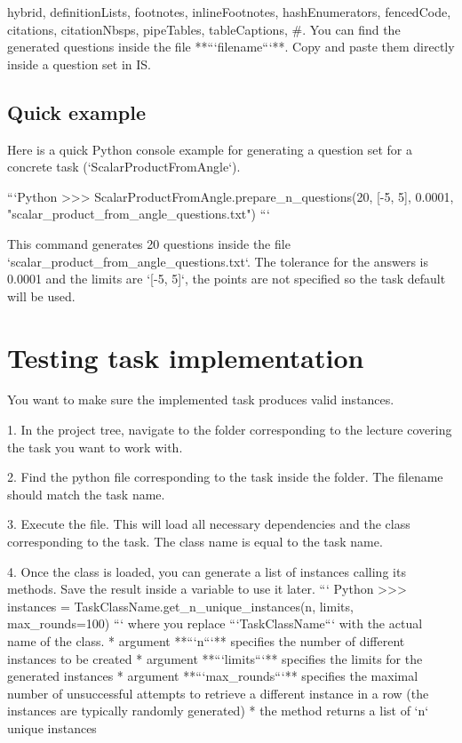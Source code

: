 \documentclass[
  digital, %
  table,   %
  twoside, %
  nolof,     %
  nolot,     %
  draft=false,
  final,
]{fithesis3}
\begin{document}
\begin{markdown*}{%
  hybrid,
  definitionLists,
  footnotes,
  inlineFootnotes,
  hashEnumerators,
  fencedCode,
  citations,
  citationNbsps,
  pipeTables,
  tableCaptions,
}
#. You can find the generated questions inside the file **```filename```**. Copy and paste them directly inside a question set in IS.

\subsection{Quick example}

Here is a quick Python console example for generating a question set for a concrete task (`ScalarProductFromAngle`).  

```Python
>>> ScalarProductFromAngle.prepare_n_questions(20, [-5, 5], 0.0001,                         "scalar_product_from_angle_questions.txt")
```

This command generates 20 questions inside the file \newline `scalar_product_from_angle_questions.txt`. The tolerance for the answers is 0.0001 and the limits are `[-5, 5]`, the points are not specified so the task default will be used. 

\section{Testing task implementation}

You want to make sure the implemented task produces valid instances. 

1. In the project tree, navigate to the folder corresponding to the lecture covering the task you want to work with.
    
2. Find the python file corresponding to the task inside the folder. The filename should match the task name.
    
3. Execute the file. This will load all necessary dependencies and the class corresponding to the task. The class name is equal to the task name. 
    
4. Once the class is loaded, you can generate a list of instances calling its methods. Save the result inside a variable to use it later.
``` Python
>>> instances = TaskClassName.get_n_unique_instances(n, limits, max_rounds=100)
```
where you replace ```TaskClassName``` with the actual name of the class. 
    * argument **```n```** specifies the number of different instances to be created
    * argument **```limits```** specifies the limits for the generated instances
    * argument **```max_rounds```** specifies the maximal number of unsuccessful attempts to retrieve a different instance in a row (the instances are typically randomly generated)
    * the method returns a list of `n` unique instances


\end{markdown*}
\end{document}

